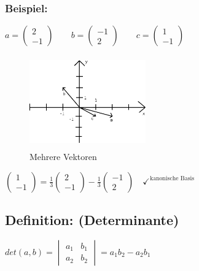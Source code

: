 \subsubsection{Beispiel:}
$a = \begin{pmatrix} 2 \\ -1 \end{pmatrix} \qquad b = \begin{pmatrix} -1 \\ 2 \end{pmatrix} \qquad c =\begin{pmatrix} 1 \\ -1 \end{pmatrix}$\\
\begin{figure} [H]
	\centering 
	\includegraphics[width=5cm, height=4cm]{mainmatter/chapter1/pics/mehrvektoren.png}
	\caption{Mehrere Vektoren} 
\end{figure}
$\begin{pmatrix} 1 \\ -1\end{pmatrix} = \frac{1}{3} \begin{pmatrix} 2 \\ -1 \end{pmatrix} - \frac{1}{3} \begin{pmatrix} -1 \\ 2 \end{pmatrix} \quad \checkmark^{\textrm{kanonische Basis}}$
%
%
%
%
\subsection{Definition: (Determinante)}
$det(a,b) = \begin{vmatrix} a_{1} & b_{1} \\ a_{2} & b_{2} \end{vmatrix}=a_{1}b_{2}-a_{2}b_{1}$
%
%
%
%
%
%
